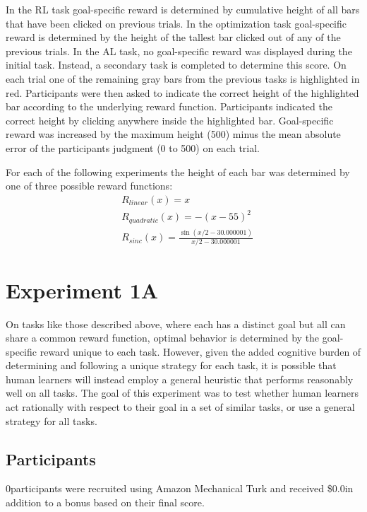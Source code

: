 \documentclass[10pt,letterpaper]{article}
\def\maxheight{500}
\def\basepay{\$0.0}
\def\numpartA{0}
\begin{document}
	In the RL task goal-specific reward is determined by cumulative height of all bars that have been clicked on previous trials. In the optimization task goal-specific reward is determined by the height of the tallest bar clicked out of any of the previous trials. In the AL task, no goal-specific reward was displayed during the initial task. Instead, a secondary task is completed to determine this score. On each trial one of the remaining gray bars from the previous tasks is highlighted in red. Participants were then asked to indicate the correct height of the highlighted bar according to the underlying reward function. Participants indicated the correct height by clicking anywhere inside the highlighted bar. Goal-specific reward was increased by the maximum height (\maxheight) minus the mean absolute error of the participants judgment (0 to \maxheight) on each trial.
	
	For each of the following experiments the height of each bar was determined by one of three possible reward functions:
	\begin{equation}
	\begin{split}
	&R_{linear}(x) = x \\
	&R_{quadratic}(x) = -(x-55)^{2} \\
	&R_{sinc}(x) = \frac{\sin(x/2-30.000001)}{x/2-30.000001}
	\end{split}
	\end{equation}
	
	\section{Experiment 1A}
	
	On tasks like those described above, where each has a distinct goal but all can share a common reward function, optimal behavior is determined by the goal-specific reward unique to each task. However, given the added cognitive burden of determining and following a unique strategy for each task, it is possible that human learners will instead employ a general heuristic that performs reasonably well on all tasks. The goal of this experiment was to test whether human learners act rationally with respect to their goal in a set of similar tasks, or use a general strategy for all tasks.
	
	\subsection{Participants}
	
	\numpartA \space participants were recruited using Amazon Mechanical Turk and received \basepay \space in addition to a bonus based on their final score.
	
\end{document}
